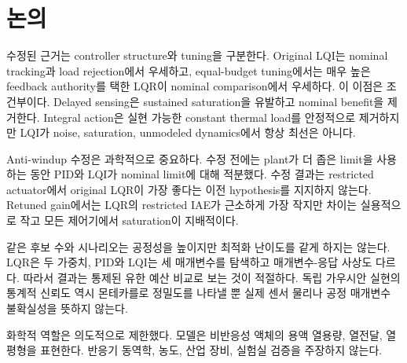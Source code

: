 \section{논의}\label{sec:discussion}
수정된 근거는 controller structure와 tuning을 구분한다. Original LQI는 nominal tracking과 load rejection에서 우세하고, equal-budget tuning에서는 매우 높은 feedback authority를 택한 LQR이 nominal comparison에서 우세하다. 이 이점은 조건부이다. Delayed sensing은 sustained saturation을 유발하고 nominal benefit을 제거한다. Integral action은 실현 가능한 constant thermal load를 안정적으로 제거하지만 LQI가 noise, saturation, unmodeled dynamics에서 항상 최선은 아니다.

Anti-windup 수정은 과학적으로 중요하다. 수정 전에는 plant가 더 좁은 limit을 사용하는 동안 PID와 LQI가 nominal limit에 대해 적분했다. 수정 결과는 restricted actuator에서 original LQR이 가장 좋다는 이전 hypothesis를 지지하지 않는다. Retuned gain에서는 LQR의 restricted IAE가 근소하게 가장 작지만 차이는 실용적으로 작고 모든 제어기에서 saturation이 지배적이다.

같은 후보 수와 시나리오는 공정성을 높이지만 최적화 난이도를 같게 하지는 않는다. LQR은 두 가중치, PID와 LQI는 세 매개변수를 탐색하고 매개변수-응답 사상도 다르다. 따라서 결과는 통제된 유한 예산 비교로 보는 것이 적절하다. 독립 가우시안 실현의 통계적 신뢰도 역시 몬테카를로 정밀도를 나타낼 뿐 실제 센서 물리나 공정 매개변수 불확실성을 뜻하지 않는다.

화학적 역할은 의도적으로 제한했다. 모델은 비반응성 액체의 용액 열용량, 열전달, 열평형을 표현한다. 반응기 동역학, 농도, 산업 장비, 실험실 검증을 주장하지 않는다.
